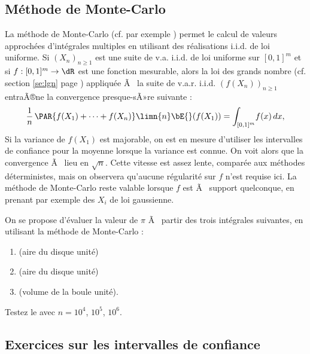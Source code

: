 %
\subsection{Méthode de Monte-Carlo}\label{ss:mc}
%

La méthode de Monte-Carlo (cf. par exemple \cite[p. 103]{dacunha-castelle-duflo})
permet le calcul de valeurs approchées d'intégrales multiples en utilisant des
réalisations i.i.d. de loi uniforme. Si $(X_n)_{n\geq 1}$ est une suite de
v.a. i.i.d. de loi uniforme sur $[0,1]^m$ et si $f:[0,1]^m\to\dR$ est une
fonction mesurable, alors la loi des grands nombre (cf. section \ref{se:lgn}
page \pageref{se:lgn}) appliquée Ã  la suite de v.a.r. i.i.d. $(f(X_n))_{n\geq
  1}$ entraÃ®ne la convergence presque-sÃ»re suivante :
$$
\frac{1}{n}\,\PAR{f(X_1)+\cdots+f(X_n)}
\limn{n}
\bE{}(f(X_1))=\int_{[0,1]^m}\! f(x)\,dx,
$$
Si la variance de $f(X_1)$ est majorable, on est en mesure d'utiliser les
intervalles de confiance pour la moyenne lorsque la variance est connue. On
voit alors que la convergence Ã  lieu en $\sqrt{n}$. Cette vitesse est assez
lente, comparée aux méthodes déterministes, mais on observera qu'aucune
régularité sur $f$ n'est requise ici. La méthode de Monte-Carlo reste valable
lorsque $f$ est Ã  support quelconque, en prenant par exemple des $X_i$ de loi
gaussienne.

\begin{xpl}
  On se propose d'évaluer la valeur de $\pi$ Ã  partir des trois intégrales
  suivantes, en utilisant la méthode de Monte-Carlo :
\begin{enumerate}
\item {} \quad (aire du disque unité)
\item {} \quad (aire du disque unité)
\item {} \quad (volume de la boule
  unité).
\end{enumerate}
%
%
Testez le avec $n=10^4$, $10^5$, $10^6$.
%
%
%
\end{xpl}

\subsection{Exercices sur les intervalles de confiance}

